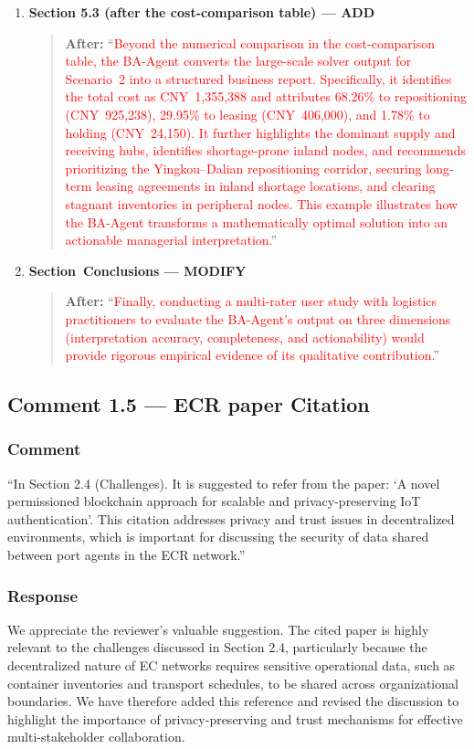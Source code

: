 \documentclass[11pt,a4paper]{article}
\begin{document}
\begin{enumerate}
\item \textbf{Section 5.3 (after the cost-comparison table) --- ADD}
\begin{quote}
\textbf{After:} ``\textcolor{red}{Beyond the numerical comparison in the cost-comparison table, the BA-Agent converts the large-scale solver output for Scenario~2 into a structured business report. Specifically, it identifies the total cost as CNY~1,355,388 and attributes 68.26\% to repositioning (CNY~925,238), 29.95\% to leasing (CNY~406,000), and 1.78\% to holding (CNY~24,150). It further highlights the dominant supply and receiving hubs, identifies shortage-prone inland nodes, and recommends prioritizing the Yingkou--Dalian repositioning corridor, securing long-term leasing agreements in inland shortage locations, and clearing stagnant inventories in peripheral nodes. This example illustrates how the BA-Agent transforms a mathematically optimal solution into an actionable managerial interpretation.}''
\end{quote}

\item \textbf{Section~Conclusions --- MODIFY}
\begin{quote}
\textbf{After:} ``\textcolor{red}{Finally, conducting a multi-rater user study with logistics practitioners to evaluate the BA-Agent's output on three dimensions (interpretation accuracy, completeness, and actionability) would provide rigorous empirical evidence of its qualitative contribution.}''
\end{quote}
\end{enumerate}

\subsection{Comment 1.5 --- ECR paper Citation}

\subsubsection{Comment}
``In Section 2.4 (Challenges). It is suggested to refer from the paper: `A novel permissioned blockchain approach for scalable and privacy-preserving IoT authentication'. This citation addresses privacy and trust issues in decentralized environments, which is important for discussing the security of data shared between port agents in the ECR network.''

\subsubsection{Response}
We appreciate the reviewer’s valuable suggestion. The cited paper is highly relevant to the challenges discussed in Section 2.4, particularly because the decentralized nature of EC networks requires sensitive operational data, such as container inventories and transport schedules, to be shared across organizational boundaries. We have therefore added this reference and revised the discussion to highlight the importance of privacy-preserving and trust mechanisms for effective multi-stakeholder collaboration.
\end{document}
